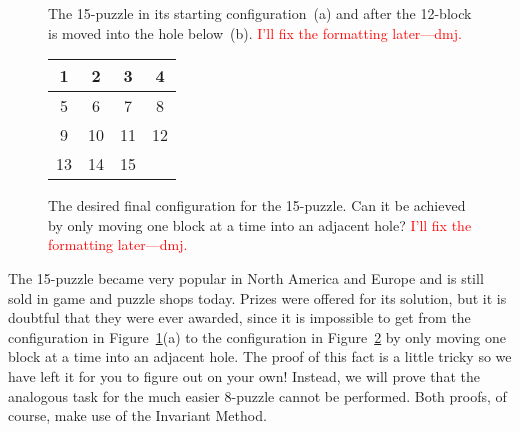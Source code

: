 \begin{figure}
\centering



\caption{The 15-puzzle in its starting configuration~(a) and after the
12-block is moved into the hole below~(b). \textcolor{red}{I'll fix
  the formatting later---dmj.}}
\label{fig:15puzzle}
\end{figure}

\begin{figure}

\begin{center}
\begin{tabular}{|c|c|c|c|}
\hline
1 & 2 & 3 & 4 \\\hline
5 & 6 & 7 & 8 \\\hline
9 & 10 & 11 & 12 \\\hline
13 & 14 & 15 &  \\\hline
\end{tabular}
\end{center}

\caption{The desired final configuration for the 15-puzzle.  Can it be
  achieved by only moving one block at a time into an adjacent hole?
  \textcolor{red}{I'll fix the formatting later---dmj.}}
\label{fig:15puzzlesolved}
\end{figure}

The 15-puzzle became very popular in North America and Europe and is
still sold in game and puzzle shops today.  Prizes were offered for
its solution, but it is doubtful that they were ever awarded, since it
is impossible to get from the configuration in
Figure~\ref{fig:15puzzle}(a) to the configuration in
Figure~\ref{fig:15puzzlesolved} by only moving one block at a time
into an adjacent hole.  The proof of this fact is a little tricky so
we have left it for you to figure out on your own!  Instead, we will
prove that the analogous task for the much easier 8-puzzle cannot be
performed.  Both proofs, of course, make use of the Invariant Method.

